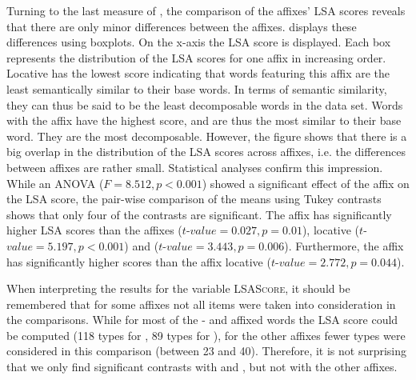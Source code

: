 Turning to the last measure of , the comparison of the affixes' LSA scores reveals that there are only minor differences between the affixes.  displays these differences using boxplots. On the x-axis the LSA score is displayed. Each box represents the distribution of the LSA scores for one affix in increasing order. Locative  has the lowest score indicating that words featuring this affix are the least semantically similar to their base words. In terms of {semantic similarity}, they can thus be said to be the least decomposable words in the data set. Words with the affix  have the highest score, and are thus the most similar to their base word. They are the most decomposable.
However, the figure shows that there is a big overlap in the distribution of the LSA scores across affixes, i.e. the differences between affixes are rather small. Statistical analyses confirm this impression.
While an ANOVA ($F=8.512, p< 0.001$) showed a significant effect of the affix on the LSA score, the pair-wise comparison of the means using Tukey contrasts shows  that only four of the contrasts are significant. The affix  has significantly higher LSA scores than the affixes  ($t$-$value=0.027, p=0.01$), locative  ($t$-$value=5.197, p< 0.001$) and   ($t$-$value=3.443, p=0.006$). Furthermore, the affix  has significantly higher scores than the  affix locative  ($t$-$value=2.772, p=0.044$). 



        When interpreting the results for the variable \textsc{LSAScore}, it should be remembered that for some affixes not all items were taken into consideration in the comparisons. While for most of the - and affixed words the LSA score could be computed (118 types for , 89 types for ), for the other affixes fewer types were considered in this comparison (between 23 and 40). Therefore, it is not surprising that we only find significant contrasts with  and , but not with the other affixes.  
        
